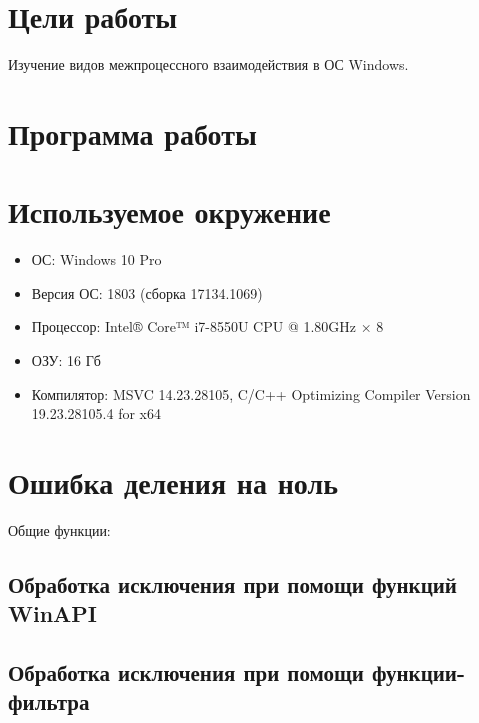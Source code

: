 





\tableofcontents
\newpage

\section{Цели работы}

Изучение видов межпроцессного взаимодействия в ОС Windows.

\section{Программа работы}



\section{Используемое окружение}

\begin{itemize}
	\item ОС: Windows 10 Pro
	\item Версия ОС: 1803 (сборка 17134.1069)
	\item Процессор: Intel® Core™ i7-8550U CPU @ 1.80GHz × 8
	\item ОЗУ: 16 Гб
	\item Компилятор: MSVC 14.23.28105, C/C++ Optimizing Compiler Version 19.23.28105.4 for x64
\end{itemize}

\section{Ошибка деления на ноль}

Общие функции:





\subsection{Обработка исключения при помощи функций WinAPI}


\subsection{Обработка исключения при помощи функции-фильтра}


